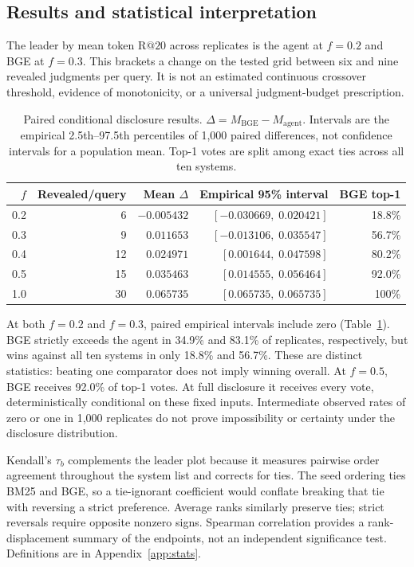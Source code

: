 \documentclass{article}
\makeatletter
\newcommand{\Rtwenty}{\mathrm{R}@20}
\makeatother
\begin{document}
\subsection{Results and statistical interpretation}
The leader by mean token $\Rtwenty$ across replicates is the agent at $f=0.2$ and BGE at $f=0.3$. This brackets a change on the tested grid between six and nine revealed judgments per query. It is not an estimated continuous crossover threshold, evidence of monotonicity, or a universal judgment-budget prescription.

\begin{table}[t]
\centering
\caption{Paired conditional disclosure results. $\Delta=M_{\mathrm{BGE}}-M_{\mathrm{agent}}$. Intervals are the empirical 2.5th--97.5th percentiles of 1,000 paired differences, not confidence intervals for a population mean. Top-1 votes are split among exact ties across all ten systems.}
\label{tab:disclosure}
\begin{tabular}{@{}rrrrr@{}}
\toprule
$f$ & Revealed/query & Mean $\Delta$ & Empirical 95\% interval & BGE top-1 \\
\midrule
0.2 & 6 & $-0.005432$ & $[-0.030669,\;0.020421]$ & 18.8\% \\
0.3 & 9 & $0.011653$ & $[-0.013106,\;0.035547]$ & 56.7\% \\
0.4 & 12 & $0.024971$ & $[0.001644,\;0.047598]$ & 80.2\% \\
0.5 & 15 & $0.035463$ & $[0.014555,\;0.056464]$ & 92.0\% \\
1.0 & 30 & $0.065735$ & $[0.065735,\;0.065735]$ & 100\% \\
\bottomrule
\end{tabular}
\end{table}

At both $f=0.2$ and $f=0.3$, paired empirical intervals include zero (Table~\ref{tab:disclosure}). BGE strictly exceeds the agent in 34.9\% and 83.1\% of replicates, respectively, but wins against all ten systems in only 18.8\% and 56.7\%. These are distinct statistics: beating one comparator does not imply winning overall. At $f=0.5$, BGE receives 92.0\% of top-1 votes. At full disclosure it receives every vote, deterministically conditional on these fixed inputs. Intermediate observed rates of zero or one in 1,000 replicates do not prove impossibility or certainty under the disclosure distribution.

Kendall's $\tau_b$ complements the leader plot because it measures pairwise order agreement throughout the system list and corrects for ties. The seed ordering ties BM25 and BGE, so a tie-ignorant coefficient would conflate breaking that tie with reversing a strict preference. Average ranks similarly preserve ties; strict reversals require opposite nonzero signs. Spearman correlation provides a rank-displacement summary of the endpoints, not an independent significance test. Definitions are in Appendix~\ref{app:stats}.
\end{document}
